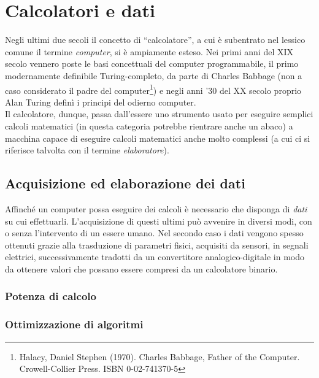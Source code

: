 
\chapter{Calcolatori e dati} %

\label{Chapter2} %


Negli ultimi due secoli il concetto di ``calcolatore'', a cui è subentrato nel
lessico comune il termine \emph{computer}, si è ampiamente esteso. Nei primi
anni del XIX secolo vennero poste le basi concettuali del computer programmabile, 
il primo modernamente definibile Turing-completo, da parte di Charles Babbage 
(non a caso considerato il padre del computer\footnote{Halacy, Daniel Stephen (1970). 
Charles Babbage, Father of the Computer. Crowell-Collier Press. ISBN 0-02-741370-5})
e negli anni '30 del XX secolo proprio Alan Turing definì i principi del odierno computer. 
\\
Il calcolatore, dunque, passa dall'essere uno strumento usato per
eseguire semplici calcoli matematici (in questa categoria potrebbe rientrare
anche un abaco) a macchina capace di eseguire calcoli matematici anche molto 
complessi (a cui ci si riferisce talvolta con il termine \emph{elaboratore}).
\\


\section{Acquisizione ed elaborazione dei dati}

Affinché un computer possa eseguire dei calcoli è necessario che disponga di
\emph{dati} su cui effettuarli. L'acquisizione di questi ultimi può avvenire
in diversi modi, con o senza l'intervento di un essere umano.
Nel secondo caso i dati vengono spesso ottenuti grazie alla trasduzione 
di parametri fisici, acquisiti da sensori, in segnali elettrici, successivamente
tradotti da un convertitore analogico-digitale in modo da ottenere valori che 
possano essere compresi da un calcolatore binario.

\subsection{Potenza di calcolo}


\subsection{Ottimizzazione di algoritmi}
